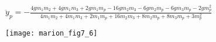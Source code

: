 \documentclass[11pt, spanish, a4paper, twoside]{article}
\begin{document}
\begin{enumerate}
\begin{minipage}[t][10cm]{0.6\textwidth}
\begin{enumerate}
		$\ddot{y}_{p} = - \frac{4 g m_{1} m_{2} + 4 g m_{1} m_{3} + 2 g m_{1} m_{p} - 16 g m_{2} m_{3} - 6 g m_{2} m_{p} - 6 g m_{3} m_{p} - 2 g m_{p}^{2}}{4 m_{1} m_{2} + 4 m_{1} m_{3} + 2 m_{1} m_{p} + 16 m_{2} m_{3} + 8 m_{2} m_{p} + 8 m_{3} m_{p} + 3 m_{p}^{2}}$
	\end{enumerate}
\end{minipage}
\begin{minipage}[c][0cm][t]{0.3\textwidth}
	\texttt{[image: marion\_fig7\_6]}
\end{minipage}



\end{enumerate}
\end{document}
